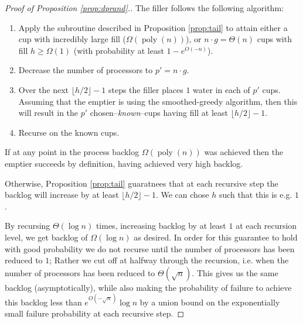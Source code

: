 \documentclass[twocolumn]{article}[11pt]
\DeclareMathOperator{\poly}{\text{poly}}
\begin{document}
\begin{proof}[Proof of Proposition \ref{prop:dprand}.]
  The filler follows the following algorithm:
  \begin{enumerate}
    \item Apply the subroutine described in Proposition \ref{prop:tail} to
      attain either a cup with incredibly large fill ($\Omega(\poly(n))$), or
      $n\cdot g = \Theta(n)$ cups with fill $h \ge \Omega(1)$ (with probability
      at least $1-e^{O(-n)}$).
    \item Decrease the number of processors to $p' = n\cdot g$. 
    \item Over the next $\lfloor h/2 \rfloor - 1$ steps the filler places $1$
      water in each of $p'$ cups. Assuming that the emptier is using the
      smoothed-greedy algorithm, then this will result in the $p'$
      chosen--\emph{known}--cups having fill at least $\lfloor h/2 \rfloor -1$.
    \item Recurse on the known cups. 
  \end{enumerate}
  If at any point in the process backlog $\Omega(\poly(n))$ was achieved then
  the emptier succeeds by definition, having achieved very high backlog.

  Otherwise, Proposition \ref{prop:tail} guaratnees that at each recursive step
  the backlog will increase by at least $\lfloor h/2\rfloor-1$. We can chose
  $h$ such that this is e.g. $1$.

  By recursing $\Theta(\log n)$ times, increasing backlog by at least $1$ at
  each recursion level, we get backlog of $\Omega(\log n)$ as desired.
  In order for this guarantee to hold with good probability we do not recurse
  until the number of processors has been reduced to $1$; Rather we cut off at 
  halfway through the recursion, i.e. when the number of processors has been
  reduced to $\Theta(\sqrt{n})$. This gives us the same backlog (asymptotically), 
  while also making the probability of failure to achieve this backlog less than
  $e^{O(-\sqrt{n})}\log n$ by a union bound on the exponentially small failure
  probability at each recursive step.
\end{proof}
\end{document}
